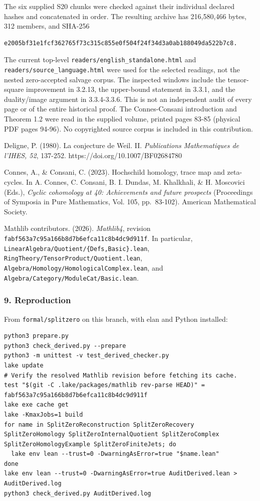 The six supplied S20 chunks were checked against their individual declared hashes and concatenated
in order. The resulting archive has 216,580,466 bytes, 312 members, and SHA-256

\begin{verbatim}
e2005bf31e1fcf362765f73c315c855e0f504f24f34d3a0ab188049da522b7c8.
\end{verbatim}

The current top-level \nolinkurl{readers/english_standalone.html} and
\nolinkurl{readers/source_language.html} were used for the selected readings, not the nested
zero-accepted salvage corpus. The inspected windows include the tensor-square improvement in 3.2.13,
the upper-bound statement in 3.3.1, and the duality/image argument in 3.3.4-3.3.6. This is not an
independent audit of every page or of the entire historical proof. The Connes-Consani introduction
and Theorem 1.2 were read in the supplied volume, printed pages 83-85 (physical PDF pages 94-96). No
copyrighted source corpus is included in this contribution.

Deligne, P. (1980). La conjecture de Weil. II. \emph{Publications Mathematiques de l'IHES, 52},
137-252. https://doi.org/10.1007/BF02684780

Connes, A., \& Consani, C. (2023). Hochschild homology, trace map and zeta-cycles. In A. Connes, C.
Consani, B. I. Dundas, M. Khalkhali, \& H. Moscovici (Eds.), \emph{Cyclic cohomology at 40:
Achievements and future prospects} (Proceedings of Symposia in Pure Mathematics, Vol. 105,
pp.~83-102). American Mathematical Society.

Mathlib contributors. (2026). \emph{Mathlib4}, revision
\nolinkurl{fabf563a7c95a166b8d7b6efca11c8b4dc9d911f}. In particular,
\texttt{LinearAlgebra/Quotient/\{Defs,Basic\}.lean},
\nolinkurl{RingTheory/TensorProduct/Quotient.lean}, \nolinkurl{Algebra/Homology/HomologicalComplex.lean},
and \nolinkurl{Algebra/Category/ModuleCat/Basic.lean}.

\subsubsection{9. Reproduction}\label{derived_main:reproduction}

From \nolinkurl{formal/splitzero} on this branch, with elan and Python installed:

\begin{verbatim}
python3 prepare.py
python3 check_derived.py --prepare
python3 -m unittest -v test_derived_checker.py
lake update
# Verify the resolved Mathlib revision before fetching its cache.
test "$(git -C .lake/packages/mathlib rev-parse HEAD)" = fabf563a7c95a166b8d7b6efca11c8b4dc9d911f
lake exe cache get
lake -KmaxJobs=1 build
for name in SplitZeroReconstruction SplitZeroRecovery SplitZeroHomology SplitZeroInternalQuotient SplitZeroComplex SplitZeroHomologyExample SplitZeroFiniteJets; do
  lake env lean --trust=0 -DwarningAsError=true "$name.lean"
done
lake env lean --trust=0 -DwarningAsError=true AuditDerived.lean > AuditDerived.log
python3 check_derived.py AuditDerived.log
\end{verbatim}

